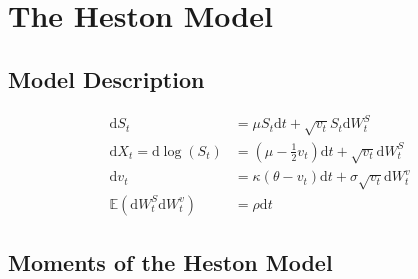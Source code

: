 \section{The Heston Model}

\subsection{Model Description}

\begin{align}
    \label{eq:heston_model_price}
    \mathrm{d}S_t &= \mu S_t\mathrm{d}t + \sqrt{v_t}S_t\mathrm{d}W_t^S \\
    \label{eq:heston_model_log_price}
    \mathrm{d}X_t = \mathrm{d}\log(S_t) &= \left(\mu-\frac{1}{2}v_t\right)\mathrm{d}t + \sqrt{v_t}\mathrm{d}W_t^S \\
    \label{eq:heston_model_variance}
    \mathrm{d}v_t &= \kappa(\theta-v_t)\mathrm{d}t + \sigma\sqrt{v_t}\mathrm{d}W_t^v \\
    \label{eq:heston_model_correlation}
    \mathbb{E}(\mathrm{d}W_t^S\mathrm{d}W_t^v) &= \rho\mathrm{d}t
\end{align}

\subsection{Moments of the Heston Model}

